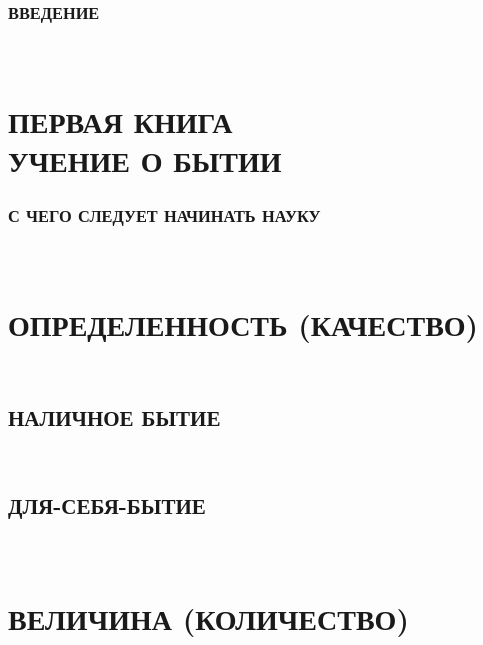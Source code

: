 \documentclass[b5paper, 11pt, twoside, onecolumn, openany]{memoir}
\newcommand{\hegchapter}[3][]{%
  \chapter[#1]{\fontsize{11}{18}\selectfont{\em\mdseries #2}\\#3}}
\begin{document}
\section[Введение]{\large ВВЕДЕНИЕ}
\thispagestyle{empty}



\part[\hspace{38mm}УЧЕНИЕ О БЫТИИ]%
     {\ \\\vspace{200pt}\Large\mdseries ПЕРВАЯ КНИГА \\
      \LARGE\bfseries УЧЕНИЕ О БЫТИИ}
\thispagestyle{empty}
\clearpage
\section[С чего следует начинать науку]{С ЧЕГО СЛЕДУЕТ НАЧИНАТЬ НАУКУ}
\pagestyle{plain}



\part[\small ОПРЕДЕЛЕННОСТЬ (КАЧЕСТВО)]%
     {\fontsize{9}{11}\selectfont{\mdseries ПЕРВЫЙ ОТДЕЛ}\\%
      \normalsize ОПРЕДЕЛЕННОСТЬ (КАЧЕСТВО)}



\hegchapter[{\em Вторая глава.} Наличное бытие]{Вторая глава}{НАЛИЧНОЕ БЫТИЕ}


\hegchapter[{\em Третья глава.} Для-себя-бытие]{Третья глава}{ДЛЯ-СЕБЯ-БЫТИЕ}



\part[\small ВЕЛИЧИНА (КОЛИЧЕСТВО)]%
     {\fontsize{9}{11}\selectfont{\mdseries ВТОРОЙ ОТДЕЛ}\\%
      \normalsize ВЕЛИЧИНА (КОЛИЧЕСТВО)}

\end{document}

